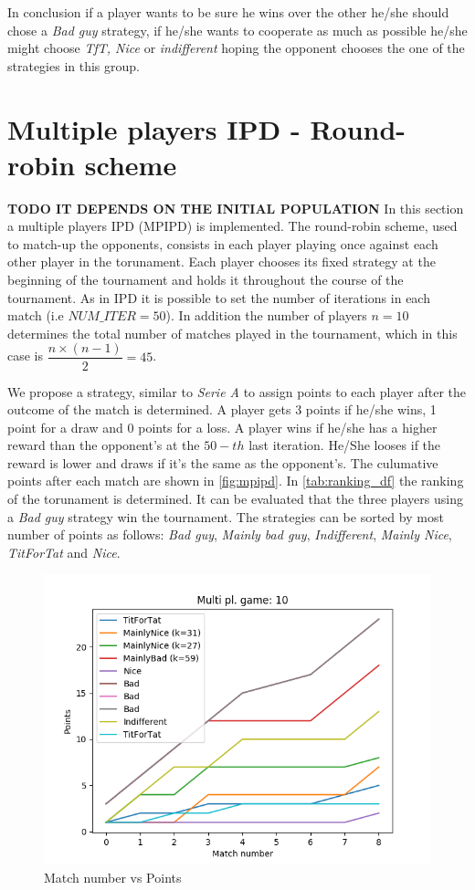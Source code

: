 \documentclass[journal,a4paper,10pt,twoside,draft]{IEEEtran}
\begin{document}
In conclusion if a player wants to be sure he wins over the other he/she should chose a \textit{Bad guy} strategy, if he/she wants to cooperate as much as possible he/she might choose \textit{TfT, Nice} or \textit{indifferent} hoping the opponent chooses the one of the strategies in this group.     

\newpage

\section{Multiple players IPD - Round-robin scheme} \label{IPDMP}
\textbf{TODO IT DEPENDS ON THE INITIAL POPULATION}
In this section a multiple players IPD (MPIPD) is implemented. The round-robin scheme, used to match-up the opponents, consists in each player playing once against each other player in the torunament.
Each player chooses its fixed strategy at the beginning of the tournament and holds it throughout the course of the tournament.
As in IPD it is possible to set the number of iterations in each match (i.e $NUM\_ITER = 50$). In addition the number of players $n = 10$ determines the total number of matches played in the tournament, which in this case is $\dfrac{n \times (n-1)}{2} = 45$.

We propose a strategy, similar to \textit{Serie A} to assign points to each player after the outcome of the match is determined. A player gets 3 points if he/she wins, 1 point for a draw and 0 points for a loss. A player wins if he/she has a higher reward than the opponent's at the $50-th$ last iteration. He/She looses if the reward is lower and draws if it's the same as the opponent's.
The culumative points after each match are shown in \autoref{fig:mpipd}.
In \autoref{tab:ranking_df} the ranking of the torunament is determined. It can be evaluated that the three players using a \textit{Bad guy} strategy win the tournament.
The strategies can be sorted by most number of points as follows: \textit{Bad guy}, \textit{Mainly bad guy}, \textit{Indifferent}, \textit{Mainly Nice}, \textit{TitForTat} and \textit{Nice}.

\begin{figure}
    \centering
    \includegraphics[width=1\columnwidth]{../img_v1/idpmp-scores-10.png}
    \caption{Match number vs Points}
    \label{fig:mpipd}
\end{figure}
\end{document}
